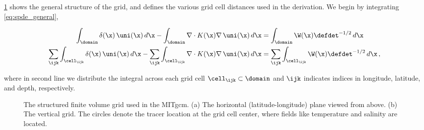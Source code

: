 \documentclass[alpha-refs]{wiley-article}
\begin{document}
\cref{fig:mitgcm_grid} shows the general structure of the grid, and
defines the various grid cell distances used in the derivation.
We begin by integrating \cref{eq:spde_general},
\begin{linenomath*}\begin{equation}
    \begin{aligned}
        \int_{\domain} \delta(\x)\,\uni(\x)\, d\x -
        \int_{\domain} \nabla\cdot K(\x)\nabla\,\uni(\x)\,d\x
        &=
        \int_{\domain} \W(\x)\defdet^{-1/2} \, d\x \\
        \sum_{\ijk}\int_{\cell_\ijk} \delta(\x)\,\uni(\x)\, d\x -
        \sum_{\ijk}\int_{\cell_\ijk} \nabla\cdot K(\x)\nabla\,\uni(\x)\,d\x
        &=
        \sum_{\ijk}\int_{\cell_\ijk} \W(\x)\defdet^{-1/2} \, d\x \, ,
    \end{aligned}
    \label{eq:spde_integral}
\end{equation}\end{linenomath*}
where in second line we distribute the integral across each grid cell
$\cell_\ijk\subset\domain$ and $\ijk$ indicates indices in longitude, latitude,
and depth, respectively.

\begin{figure}
    \centering
    \caption{The structured finite volume grid used in the MITgcm.
        (a) The horizontal (latitude-longitude) plane viewed from above.
        (b) The vertical grid.
        The circles denote the tracer location at the grid cell center,
        where fields like temperature and salinity are located.
    }
    \label{fig:mitgcm_grid}
\end{figure}
\end{document}
